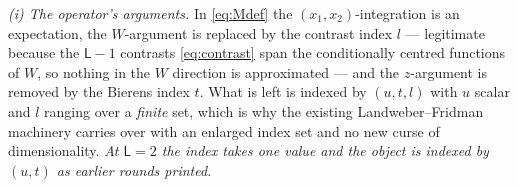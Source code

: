 \begin{remark}\label{rem:draftrec}
\emph{(i) The operator's arguments.} In \eqref{eq:Mdef} the $(x_1,x_2)$-integration is an expectation,
the $W$-argument is replaced by the contrast index $l$ --- legitimate because the $\mathsf L-1$
contrasts \eqref{eq:contrast} span the conditionally centred functions of $W$, so nothing in the $W$
direction is approximated --- and
the $z$-argument is removed by the Bierens index $t$. What is left is indexed by $(u,t,l)$ with $u$
scalar and $l$ ranging over a \emph{finite} set, which is why the existing Landweber--Fridman machinery
carries over with an enlarged index set
and no new curse of dimensionality. \emph{At $\mathsf L=2$ the index takes one value and the object is
indexed by $(u,t)$ as earlier rounds printed.}


\end{remark}
